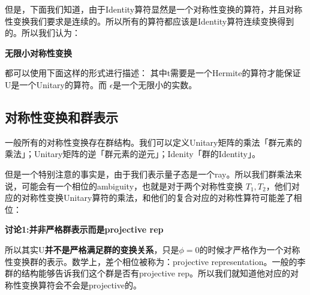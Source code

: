 但是，下面我们知道，由于Identity算符显然是一个对称性变换的算符，并且对称性变换我们要求是连续的。所以所有的算符都应该是Identity算符连续变换得到的。所以我们认为：

\textbf{无限小对称性变换}

都可以使用下面这样的形式进行描述：
其中t需要是一个Hermite的算符才能保证U是一个Unitary的算符。而 $ \epsilon $是一个无限小的实数。 

\subsection{对称性变换和群表示}

一般所有的对称性变换存在群结构。我们可以定义Unitary矩阵的乘法「群元素的乘法」；Unitary矩阵的逆「群元素的逆元」；Idenity「群的Identity」。

但是一个特别注意的事实是，由于我们表示量子态是一个ray。所以我们群乘法来说，可能会有一个相位的ambiguity，也就是对于两个对称性变换 $ T_1,T_2 $，他们对应的对称性变换Unitary算符的乘法，和他们的复合对应的对称性算符可能差了相位：

\textbf{讨论1:并非严格群表示而是projective rep}

所以其实U\textbf{并不是严格满足群的变换关系}，只是$ \phi = 0 $的时候才严格作为一个对称性变换群的表示。数学上，差个相位被称为：projective representation。一般的李群的结构能够告诉我们这个群是否有projective rep。所以我们就知道他对应的对称性变换算符会不会是projective的。
\bigskip

